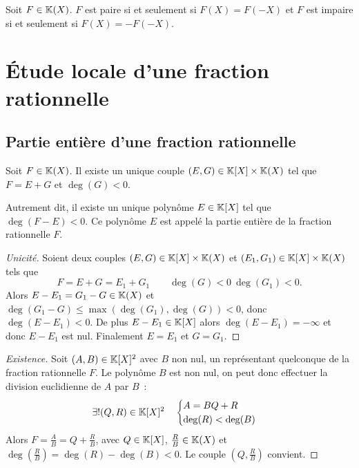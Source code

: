 \begin{defdef}
  Soit \(F \in \mathbb{K}(X)\). \(F\) est paire si et seulement si \(F(X)=F(-X)\) et \(F\) est impaire si et seulement si \(F(X)=-F(-X)\).
\end{defdef}

\section{Étude locale d'une fraction rationnelle}

\subsection{Partie entière d'une fraction rationnelle}

\begin{theo}
  Soit \(F \in \mathbb{K}(X)\). Il existe un unique couple \((E,G) \in \mathbb{K}[X]\times\mathbb{K}(X)\) tel que \(F=E+G\) et \(\deg(G)<0\).

  Autrement dit, il existe un unique polynôme \(E \in \mathbb{K}[X]\) tel que \(\deg(F-E)<0\). Ce polynôme \(E\) est appelé la partie entière de la fraction rationnelle \(F\).
\end{theo}
\begin{proof}[Unicité]
  Soient deux couples \((E,G) \in \mathbb{K}[X]\times\mathbb{K}(X)\) et \((E_1,G_1) \in \mathbb{K}[X]\times\mathbb{K}(X)\) tels que
  \begin{equation}
    F=E+G=E_1+G_1 \qquad \deg(G)<0 \ \deg(G_1)<0.
  \end{equation}
  Alors \(E-E_1=G_1-G \in \mathbb{K}(X)\) et \(\deg(G_1-G)\leqslant \max(\deg(G_1),\deg(G))<0\), donc \(\deg(E-E_1)<0\). De plus \(E-E_1 \in \mathbb{K}[X]\) alors \(\deg(E-E_1)=-\infty\) et donc \(E-E_1\) est nul. Finalement \(E=E_1\) et \(G=G_1\).
\end{proof}
\begin{proof}[Existence]
  Soit \((A,B) \in \mathbb{K}[X]^2\) avec \(B\) non nul, un représentant quelconque de la fraction rationnelle \(F\). Le polynôme \(B\) est non nul, on peut donc effectuer la division euclidienne de \(A\) par \(B\)~:
  \begin{equation}
    \exists! (Q,R) \in \mathbb{K}[X]^2 \quad \begin{cases} A=BQ+R \\ \deg(R) < \deg(B) \end{cases}
  \end{equation}
  Alors \(F=\frac{A}{B}=Q+\frac{R}{B}\), avec \(Q \in \mathbb{K}[X]\), \(\frac{R}{B} \in \mathbb{K}(X)\) et \(\deg\left(\frac{R}{B}\right)=\deg(R)-\deg(B)<0\). Le couple \((Q,\frac{R}{B})\) convient.
\end{proof}

